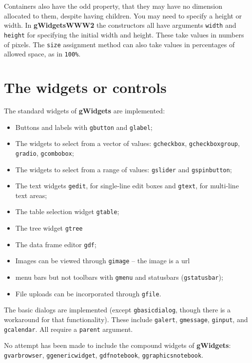 \documentclass[12pt]{article}
\newcommand{\pkg}[1]{\textbf{#1}}
\newcommand{\code}[1]{\texttt{#1}}
\begin{document}
Containers also have the odd property, that they may have no
dimension allocated to them, despite having children. You may need to
specify a height or width.  In \pkg{gWidgetsWWW2} the constructors all
have arguments \code{width} and \code{height} for specifying the
initial width and height. These take values in numbers of pixels. The
\code{size} assignment method can also take values in percentages of
allowed space, as in \code{100\%}.



\section{The widgets or controls}
\label{sec:what-works}

The standard widgets of \pkg{gWidgets} are implemented:
\begin{itemize}
\item Buttons and labels with \code{gbutton} and \code{glabel};
\item The widgets to select from a vector of values:
  \code{gcheckbox}, \code{gcheckboxgroup}, \code{gradio}, \code{gcombobox};
\item The widgets to select from a range of values: \code{gslider} and \code{gspinbutton};
\item The text widgets \code{gedit}, for single-line edit boxes and
  \code{gtext}, for multi-line text areas;
\item The table selection widget \code{gtable};
\item The tree widget \code{gtree}
\item The data frame editor \code{gdf};
\item Images can be viewed through \code{gimage} -- the image is a url
\item menu bars but not toolbars with \code{gmenu} and statusbars
  (\code{gstatusbar});
\item File uploads can be incorporated through \code{gfile}.
\end{itemize}


The basic dialogs are implemented (except \code{gbasicdialog}, though
there is a workaround for that functionality). These
include \code{galert}, \code{gmessage}, \code{ginput}, and
\code{gcalendar}.  All require a \code{parent} argument.


No attempt has been made to include the compound widgets of \pkg{gWidgets}:
\code{gvarbrowser}, \code{ggenericwidget}, \code{gdfnotebook},
\code{ggraphicsnotebook}.
\end{document}
